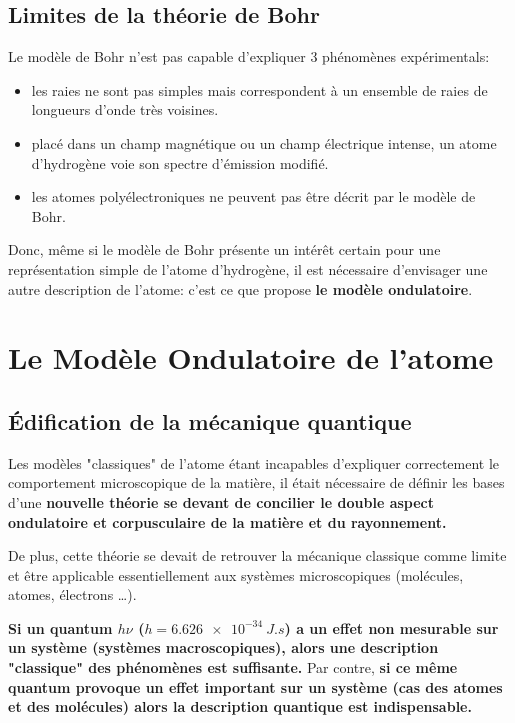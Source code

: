 \documentclass{article}
\begin{document}
\subsection{Limites de la théorie de Bohr}
\noindent Le modèle de Bohr n'est pas capable d'expliquer 3 phénomènes expérimentals:
\begin{itemize}[label=$\ast$]
    \item les raies ne sont pas simples mais correspondent à un ensemble de raies de longueurs
    d'onde très voisines.
    \item placé dans un champ magnétique ou un champ électrique intense,
    un atome d'hydrogène voie son spectre d'émission modifié.
    \item les atomes polyélectroniques ne peuvent pas être décrit par le modèle de Bohr.
\end{itemize}

\noindent Donc, même si le modèle de Bohr présente un intérêt certain pour une représentation 
simple de l'atome d'hydrogène, il est nécessaire d'envisager une autre description de l'atome: c'est ce que propose \textbf{le modèle ondulatoire}. 


\section{Le Modèle Ondulatoire de l'atome}

\subsection{Édification de la mécanique quantique}

Les modèles "classiques" de l'atome étant incapables d'expliquer correctement le
comportement microscopique de la matière, il était nécessaire de définir les bases
d'une \textbf{nouvelle théorie se devant de concilier le
double aspect ondulatoire et corpusculaire de la matière et du rayonnement.} 

De plus, cette théorie se devait de retrouver la mécanique classique comme limite
et être applicable essentiellement aux systèmes microscopiques
(molécules, atomes, électrons \dots). 

\textbf{Si un quantum $h\nu$ ($h = \qty{6,626e-34}{J.s}$) a un effet non mesurable
sur un système (systèmes macroscopiques), alors une description
"classique" des phénomènes est suffisante.} Par contre, \textbf{si ce même quantum provoque un
effet important sur un système (cas des atomes et des molécules) alors la description quantique est indispensable.}
\end{document}
